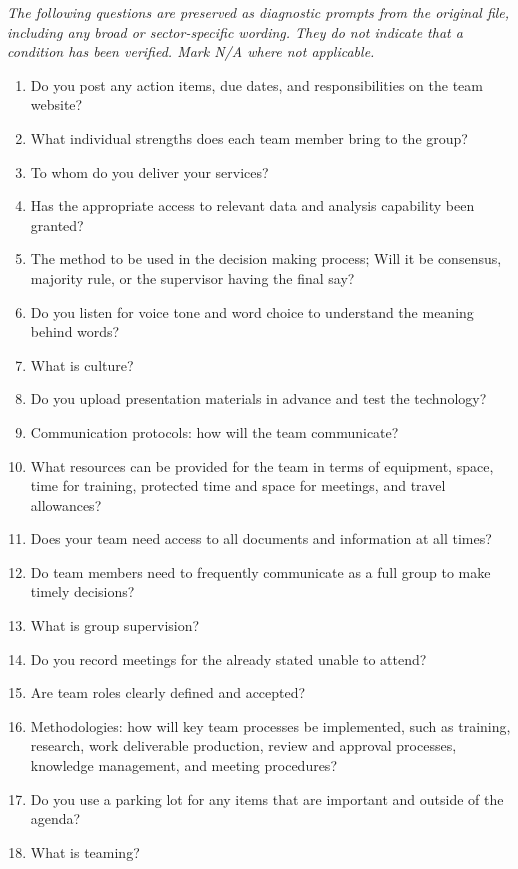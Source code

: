 \documentclass[10pt,letterpaper]{article}
\begin{document}
\textit{The following questions are preserved as diagnostic prompts from the original file, including any broad or sector-specific wording. They do not indicate that a condition has been verified. Mark N/A where not applicable.}
\begingroup\small\begin{enumerate}[leftmargin=2.1em, itemsep=4pt]
\item[1.] Do you post any action items, due dates, and responsibilities on the team website?
\item[2.] What individual strengths does each team member bring to the group?
\item[3.] To whom do you deliver your services?
\item[4.] Has the appropriate access to relevant data and analysis capability been granted?
\item[5.] The method to be used in the decision making process; Will it be consensus, majority rule, or the supervisor having the final say?
\item[6.] Do you listen for voice tone and word choice to understand the meaning behind words?
\item[7.] What is culture?
\item[8.] Do you upload presentation materials in advance and test the technology?
\item[9.] Communication protocols: how will the team communicate?
\item[10.] What resources can be provided for the team in terms of equipment, space, time for training, protected time and space for meetings, and travel allowances?
\item[11.] Does your team need access to all documents and information at all times?
\item[12.] Do team members need to frequently communicate as a full group to make timely decisions?
\item[13.] What is group supervision?
\item[14.] Do you record meetings for the already stated unable to attend?
\item[15.] Are team roles clearly defined and accepted?
\item[16.] Methodologies: how will key team processes be implemented, such as training, research, work deliverable production, review and approval processes, knowledge management, and meeting procedures?
\item[17.] Do you use a parking lot for any items that are important and outside of the agenda?
\item[18.] What is teaming?

\end{enumerate}
\end{document}
